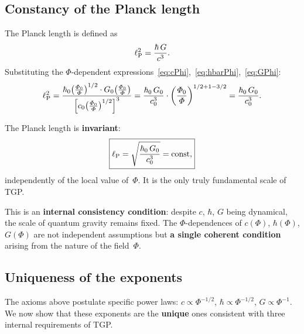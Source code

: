 \subsection{Constancy of the Planck length}\label{ssec:lP}

The Planck length is defined as
\begin{equation}
    \ell_{\mathrm{P}}^2 = \frac{\hbar\,G}{c^3}.
\end{equation}
Substituting the $\Phi$-dependent
expressions~\eqref{eq:cPhi},~\eqref{eq:hbarPhi},~\eqref{eq:GPhi}:
\begin{equation}
    \ell_{\mathrm{P}}^2
    = \frac{\hbar_0\!\left(\frac{\varPhi_0}{\varPhi}\right)^{1/2}
            \cdot G_0\!\left(\frac{\varPhi_0}{\varPhi}\right)}
           {\left[c_0\!\left(\frac{\varPhi_0}{\varPhi}\right)^{1/2}\right]^3}
    = \frac{\hbar_0\,G_0}{c_0^3}
      \cdot \left(\frac{\varPhi_0}{\varPhi}\right)^{1/2+1-3/2}
    = \frac{\hbar_0\,G_0}{c_0^3}.
\end{equation}

\begin{theorem}\label{thm:lP}
The Planck length is \textbf{invariant}:
\begin{equation}\label{eq:lP-const}
    \boxed{\ell_{\mathrm{P}} = \sqrt{\frac{\hbar_0\,G_0}{c_0^3}} = \mathrm{const},}
\end{equation}
independently of the local value of~$\Phi$.
It is the only truly fundamental scale of TGP.
\end{theorem}

This is an \textbf{internal consistency condition}: despite
$c$, $\hbar$, $G$ being dynamical, the scale of quantum gravity
remains fixed.  The $\Phi$-dependences of
$c(\Phi)$, $\hbar(\Phi)$, $G(\Phi)$ are not independent
assumptions but \textbf{a single coherent condition}
arising from the nature of the field~$\Phi$.

\subsection{Uniqueness of the exponents}\label{ssec:wykladniki}

The axioms above postulate specific power laws:
$c \propto \Phi^{-1/2}$,
$\hbar \propto \Phi^{-1/2}$,
$G \propto \Phi^{-1}$.
We now show that these exponents are the \textbf{unique}
ones consistent with three internal requirements of TGP.

